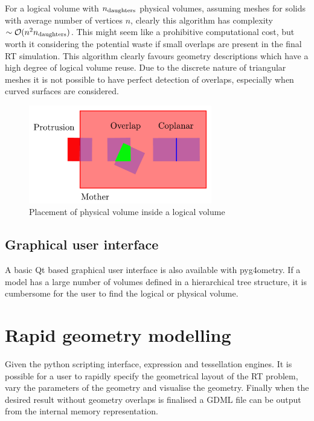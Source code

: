 \documentclass[final,5p,times,twocolumn]{elsarticle}
\begin{document}
For a logical volume with $n_{\rm daughters}$ physical volumes, assuming meshes for solids with average number of vertices $n$, clearly this algorithm 
has complexity $\sim \mathcal{O}(n^2 n_{\rm daughters})$. This might seem like a prohibitive computational cost, but worth it considering the potential 
waste if small overlaps are present in the final RT simulation. This algorithm clearly favours geometry descriptions which have a high degree of logical 
volume reuse. Due to the discrete nature of triangular meshes it is not possible to have perfect detection of overlaps, especially when curved surfaces are 
considered. 
 \begin{figure}[htbp]
\begin{center}
\includegraphics[width=8cm]{./diagrams/overlap.pdf}
\caption{Placement of physical volume inside a logical volume}
\label{fig:overlap}
\end{center}
\end{figure} 

\subsection{Graphical user interface}
A basic Qt based graphical user interface is also available with pyg4ometry. If a model has a large number of volumes defined in a hierarchical tree structure, it is cumbersome for the user to find the logical or physical volume.    

\section{Rapid geometry modelling}
Given the python scripting interface, expression  and tessellation engines. It is possible for a user to rapidly specify the geometrical layout of the RT problem, vary 
the parameters of the geometry and visualise the geometry. Finally when the desired result without geometry overlaps is finalised a GDML file can be output
from the internal memory representation. 
\end{document}
